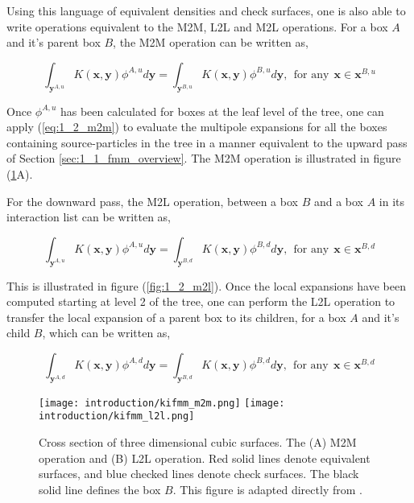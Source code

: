 Using this language of equivalent densities and check surfaces, one is also able to
write operations equivalent to the \gls{M2M}, \gls{L2L} and \gls{M2L} operations. For a box $A$
and it's parent box $B$, the \gls{M2M} operation can be written as,

\begin{equation}
    \int_{\mathbf{y}^{A,u}} K(\mathbf{x}, \mathbf{y})\phi^{A, u} d\mathbf{y} =   \int_{\mathbf{y}^{B,u}} K(\mathbf{x}, \mathbf{y})\phi^{B, u} d\mathbf{y}, \> \> \text{for any} \> \> \mathbf{x} \in \mathbf{x}^{B, u}
    \label{eq:1_2_m2m}
\end{equation}

Once $\phi^{A, u}$ has been calculated for boxes at the leaf level of the tree,
one can apply (\ref{eq:1_2_m2m}) to evaluate the multipole expansions for all
the boxes containing \gls{source-particles} in the tree in a manner equivalent
to the upward pass of Section \ref{sec:1_1_fmm_overview}. The \gls{M2M} operation is
illustrated in figure (\ref{fig:1_2_m2m_l2l}A).

For the downward pass, the \gls{M2L} operation, between a box $B$ and a box $A$ in its
interaction list can be written as,

\begin{equation}
    \int_{\mathbf{y}^{A,u}} K(\mathbf{x}, \mathbf{y})\phi^{A, u} d\mathbf{y} =   \int_{\mathbf{y}^{B,d}} K(\mathbf{x}, \mathbf{y})\phi^{B, d} d\mathbf{y}, \> \> \text{for any} \> \> \mathbf{x} \in \mathbf{x}^{B, d}
\label{eq:1_2_m2l}
\end{equation}

This is illustrated in figure (\ref{fig:1_2_m2l}). Once the local expansions
have  been computed starting at level 2 of the tree, one can perform the L2L
operation to transfer the local expansion of a parent box to its children,
for a box $A$ and it's child $B$, which can be written as,

\begin{equation}
    \int_{\mathbf{y}^{A,d}} K(\mathbf{x}, \mathbf{y})\phi^{A, d} d\mathbf{y} =   \int_{\mathbf{y}^{B,d}} K(\mathbf{x}, \mathbf{y})\phi^{B, d} d\mathbf{y}, \> \> \text{for any} \> \> \mathbf{x} \in \mathbf{x}^{B, d}
    \label{eq:1_2_l2l}
\end{equation}

\begin{figure}[!h]
    \centering
    {\texttt{[image: introduction/kifmm\_m2m.png]}}
    \hfill
  {\texttt{[image: introduction/kifmm\_l2l.png]}}
  \vspace{0pt}
  \caption{Cross section of three dimensional cubic surfaces. The (A) \gls{M2M} operation and (B) \gls{L2L} operation. Red solid lines
  denote equivalent surfaces, and blue checked lines denote check surfaces.
  The black solid line defines the box $B$. This figure is adapted directly from \cite{Ying:2004:JCP}.}
  \label{fig:1_2_m2m_l2l}
\end{figure}

